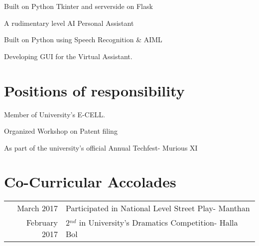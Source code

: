 \documentclass[letterpaper]{akhilesh}
\begin{document}
\begin{minipage}[t]{0.599\textwidth}
\descript{}
\begin{tightemize}
\item Built on Python Tkinter and serverside on Flask 
\end{tightemize}
\sectionsep

\descript{}
\begin{tightemize}
\item A rudimentary level AI Personal Assistant
\item Built on Python using Speech Recognition \& AIML
\item Developing GUI for the Virtual Assistant.
\end{tightemize}
\sectionsep

\section{Positions of responsibility}
\begin{tightemize}
\item Member of University's E-CELL.
\end{tightemize}
\begin{tightemize}
\item Organized Workshop on Patent filing
\end{tightemize}
\begin{tightemize}
\item As part of the university’s official Annual Techfest- Murious XI
\end{tightemize}
\sectionsep 


\section{Co-Curricular Accolades}
\begin{tabular}{rl}
March 2017 & Participated in National Level Street Play-  Manthan\\
February 2017 & 2$^{nd}$ in University's Dramatics Competition- Halla Bol\\
\end{tabular}


\end{minipage} 
\end{document}
